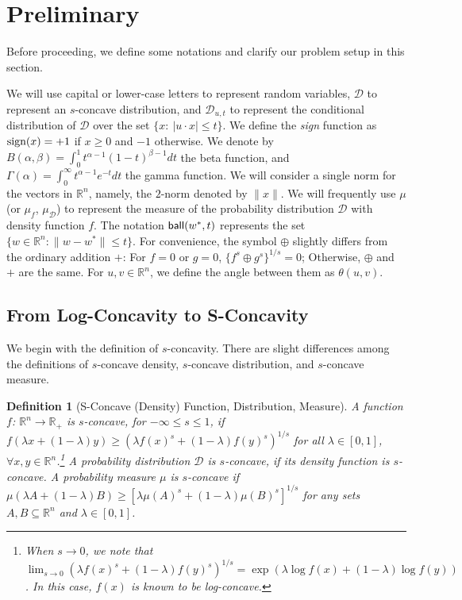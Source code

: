 \documentclass[11pt]{article}
\newcommand{\cD}{\mathcal{D}}
\newcommand{\R}{\mathbb{R}}
\newcommand{\sign}{\textup{sign}}
\newcommand{\ball}{\textup{\textsf{ball}}}
\newtheorem{definition}{Definition}
\begin{document}
\section{Preliminary}

Before proceeding, we define some notations and clarify our problem setup in this section.


\medskip
{}
We will use capital or lower-case letters to represent random variables, $\cD$ to represent an $s$-concave distribution, and $\cD_{u,t}$ to represent the conditional distribution of $\cD$ over the set $\{x:\ |u\cdot x|\le t\}$. We define the \emph{sign} function as $\sign(x)=+1$ if $x\ge 0$ and $-1$ otherwise. We denote by $B(\alpha,\beta)=\int_0^1 t^{\alpha-1}(1-t)^{\beta-1}dt$ the beta function, and $\Gamma(\alpha)=\int_0^\infty t^{\alpha-1}e^{-t}dt$ the gamma function. We will consider a single norm for the vectors in $\R^n$, namely, the $2$-norm denoted by $\|x\|$. We will frequently use $\mu$ (or $\mu_f$, $\mu_\cD$) to represent the measure of the probability distribution $\cD$ with density function $f$. The notation $\ball(w^*,t)$ represents the set $\{w\in\R^n: \|w-w^*\|\le t\}$. For convenience, the symbol $\oplus$ slightly differs from the ordinary addition $+$: For $f=0$ or $g=0$, $\{f^s\oplus g^s\}^{1/s}=0$; Otherwise, $\oplus$ and $+$ are the same. For $u,v\in\R^n$, we define the angle between them as $\theta(u,v)$.


\subsection{From Log-Concavity to S-Concavity}
We begin with the definition of $s$-concavity. There are slight differences among the definitions of $s$-concave density, $s$-concave distribution, and $s$-concave measure.
\begin{definition}[S-Concave (Density) Function, Distribution, Measure]
\label{definition: s-concavity}
A function $f$: $\R^n\rightarrow \R_+$ is $s$-concave, for $-\infty\le s\le 1$, if
$f(\lambda x+(1-\lambda)y)\ge (\lambda f(x)^s+(1-\lambda)f(y)^s)^{1/s}$
for all $\lambda\in[0,1]$, $\forall x,y\in\R^n$.\footnote{When $s\rightarrow 0$, we note that $\lim_{s\rightarrow 0}(\lambda f(x)^s+(1-\lambda)f(y)^s)^{1/s}=\exp(\lambda \log f(x)+(1-\lambda)\log f(y))$. In this case, $f(x)$ is known to be log-concave.}
A probability distribution $\cD$ is $s$-concave, if its density function is $s$-concave.
A probability measure $\mu$ is $s$-concave if
$\mu(\lambda A+(1-\lambda)B)\ge[\lambda\mu(A)^s+(1-\lambda)\mu(B)^s]^{1/s}$
for any sets $A,B\subseteq\R^n$ and $\lambda\in[0,1]$.
\end{definition}
\end{document}
